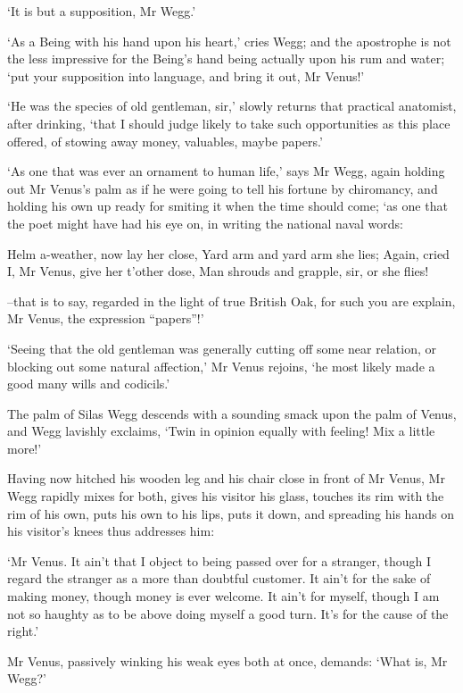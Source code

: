‘It is but a supposition, Mr Wegg.’

‘As a Being with his hand upon his heart,’ cries Wegg; and the
apostrophe is not the less impressive for the Being’s hand being
actually upon his rum and water; ‘put your supposition into language,
and bring it out, Mr Venus!’

‘He was the species of old gentleman, sir,’ slowly returns that
practical anatomist, after drinking, ‘that I should judge likely to
take such opportunities as this place offered, of stowing away money,
valuables, maybe papers.’

‘As one that was ever an ornament to human life,’ says Mr Wegg, again
holding out Mr Venus’s palm as if he were going to tell his fortune by
chiromancy, and holding his own up ready for smiting it when the time
should come; ‘as one that the poet might have had his eye on, in writing
the national naval words:

     Helm a-weather, now lay her close,
            Yard arm and yard arm she lies;
     Again, cried I, Mr Venus, give her t’other dose,
            Man shrouds and grapple, sir, or she flies!

--that is to say, regarded in the light of true British Oak, for such
you are explain, Mr Venus, the expression “papers”!’

‘Seeing that the old gentleman was generally cutting off some near
relation, or blocking out some natural affection,’ Mr Venus rejoins, ‘he
most likely made a good many wills and codicils.’

The palm of Silas Wegg descends with a sounding smack upon the palm
of Venus, and Wegg lavishly exclaims, ‘Twin in opinion equally with
feeling! Mix a little more!’

Having now hitched his wooden leg and his chair close in front of Mr
Venus, Mr Wegg rapidly mixes for both, gives his visitor his glass,
touches its rim with the rim of his own, puts his own to his lips, puts
it down, and spreading his hands on his visitor’s knees thus addresses
him:

‘Mr Venus. It ain’t that I object to being passed over for a stranger,
though I regard the stranger as a more than doubtful customer. It ain’t
for the sake of making money, though money is ever welcome. It ain’t for
myself, though I am not so haughty as to be above doing myself a good
turn. It’s for the cause of the right.’

Mr Venus, passively winking his weak eyes both at once, demands: ‘What
is, Mr Wegg?’

